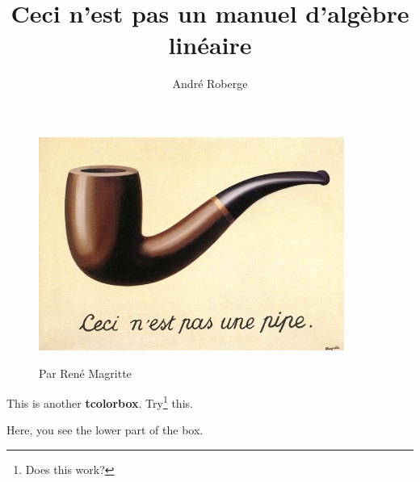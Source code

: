 \documentclass[oneside,openany]{tufte-book}
\title{{\small Ceci n'est pas un manuel d'\newline}algèbre linéaire}
\author{Andr\'e Roberge}
\begin{document}
\maketitle

\hphantom{a}
\vfill
\begin{figure}
\includegraphics{./../images/MagrittePipe.jpg}
\begin{center}
Par René Magritte
\end{center}
\end{figure}
\vfill

\tableofcontents







\begin{tcolorbox}
This is another \textbf{tcolorbox}.
Try\footnote{Does this work?} this.

\tcblower
Here, you see the lower part of the box.
\end{tcolorbox}
\end{document}
